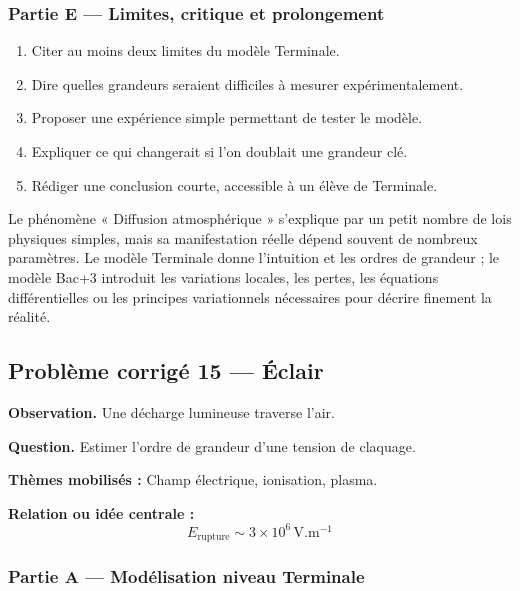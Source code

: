 \documentclass[11pt,a4paper]{article}
\begin{document}
\subsubsection*{Partie E — Limites, critique et prolongement}

\begin{enumerate}
  \item Citer au moins deux limites du modèle Terminale.
  \item Dire quelles grandeurs seraient difficiles à mesurer expérimentalement.
  \item Proposer une expérience simple permettant de tester le modèle.
  \item Expliquer ce qui changerait si l'on doublait une grandeur clé.
  \item Rédiger une conclusion courte, accessible à un élève de Terminale.
\end{enumerate}

\begin{corrigebox}
Le phénomène « Diffusion atmosphérique » s'explique par un petit nombre de lois physiques simples, mais sa manifestation réelle dépend souvent de nombreux paramètres. Le modèle Terminale donne l'intuition et les ordres de grandeur ; le modèle Bac+3 introduit les variations locales, les pertes, les équations différentielles ou les principes variationnels nécessaires pour décrire finement la réalité.
\end{corrigebox}

\subsection{Problème corrigé 15 — Éclair}

\begin{exercicebox}
\textbf{Observation.} Une décharge lumineuse traverse l'air.

\medskip
\textbf{Question.} Estimer l'ordre de grandeur d'une tension de claquage.

\medskip
\textbf{Thèmes mobilisés :} Champ électrique, ionisation, plasma.

\medskip
\textbf{Relation ou idée centrale :}
\[
E_{\mathrm{rupture}}\sim 3\times10^6\,\mathrm{V.m^{-1}}
\]
\end{exercicebox}

\subsubsection*{Partie A — Modélisation niveau Terminale}
\end{document}
